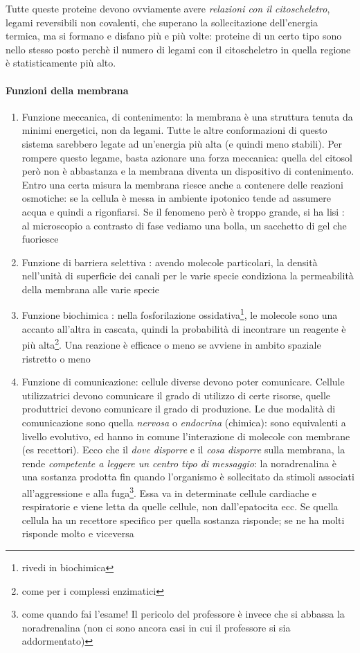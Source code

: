 \documentclass[a4paper,12pt]{article}
\begin{document}
Tutte queste proteine devono ovviamente avere \emph{relazioni con il citoscheletro}, legami reversibili non covalenti, che superano la sollecitazione dell'energia termica, ma si formano e disfano più e più volte: proteine di un certo tipo sono nello stesso posto perchè il numero di legami con il citoscheletro in quella regione è statisticamente più alto.

\paragraph{Funzioni della membrana}
\begin{enumerate}
\item{Funzione meccanica, di contenimento: la membrana è una struttura tenuta da minimi energetici, non da legami. Tutte le altre conformazioni di questo sistema sarebbero legate ad un'energia più alta (e quindi meno stabili). Per rompere questo legame, basta azionare una forza meccanica: quella del citosol però non è abbastanza e la membrana diventa un dispositivo di contenimento.  Entro una certa misura la membrana riesce anche a contenere delle reazioni osmotiche: se la cellula è messa in ambiente ipotonico tende ad assumere acqua e quindi a rigonfiarsi. Se il fenomeno però è troppo grande, si ha lisi : al microscopio a contrasto di fase vediamo una bolla, un sacchetto di gel che fuoriesce}
\item{Funzione di barriera selettiva : avendo molecole particolari, la densità nell'unità di superficie dei canali per le varie specie condiziona la permeabilità della membrana alle varie specie}
\item{Funzione biochimica : nella fosforilazione ossidativa\footnote{rivedi in biochimica}, le molecole sono una accanto all'altra in cascata, quindi la probabilità di incontrare un reagente è più alta\footnote{come per i complessi enzimatici}. Una reazione è efficace o meno se avviene in ambito spaziale ristretto o meno}
\item{Funzione di comunicazione: cellule diverse devono poter comunicare. Cellule utilizzatrici devono comunicare il grado di utilizzo di certe risorse, quelle produttrici devono comunicare il grado di produzione. Le due modalità di comunicazione sono quella \emph{nervosa} o \emph{endocrina} (chimica): sono equivalenti a livello evolutivo, ed hanno in comune l'interazione di molecole con membrane (es recettori). Ecco che il \emph{dove disporre} e il \emph{cosa disporre} sulla membrana, la rende \emph{competente a leggere un centro tipo di messaggio}: la noradrenalina è una sostanza prodotta fin quando l'organismo è sollecitato da stimoli associati all'aggressione e alla fuga\footnote{come quando fai l'esame! Il pericolo del professore è invece che si abbassa la noradrenalina (non ci sono ancora casi in cui il professore si sia addormentato)}. Essa va in determinate cellule cardiache e respiratorie e viene letta da quelle cellule, non dall'epatocita ecc. Se quella cellula ha un recettore specifico per quella sostanza risponde; se ne ha molti risponde molto e viceversa}
\end{enumerate}
\end{document}
